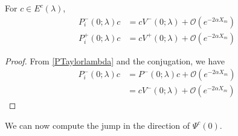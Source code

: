 \documentclass[thesis.tex]{subfiles}
\begin{document}
\begin{lemma}\label{Ecconj}
For $c \in E^c(\lambda)$, 
\begin{align*}
P_i^-(0; \lambda)c &= c V^-(0; \lambda) + \mathcal{O}(e^{-2\alpha X_m}) \\
P_i^+(0; \lambda)c &= c V^+(0; \lambda) + \mathcal{O}(e^{-2\alpha X_m})
\end{align*}
\begin{proof}
From \eqref{PTaylorlambda} and the conjugation, we have
\begin{align*}
P_i^-(0; \lambda)c &= P^-(0; \lambda)c + \mathcal{O}(e^{-2\alpha X_m}) \\
&= c V^-(0; \lambda) + \mathcal{O}(e^{-2\alpha X_m})
\end{align*}
\end{proof}
\end{lemma}

We can now compute the jump in the direction of $\Psi^c(0)$.
\end{document}
